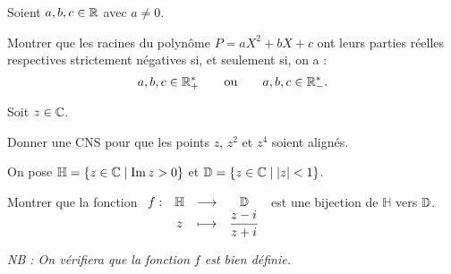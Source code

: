 \begin{corr}
\end{corr}

\begin{exo}[Exercice 18]
Soient \(a,b,c\in\mathbb{R}\) avec \(a\not=0\).

Montrer que les racines du polynôme \(P=aX^2+bX+c\) ont leurs parties réelles respectives strictement négatives si, et seulement si, on a : \[a,b,c\in\mathbb{R}_+^*\qquad\text{ou}\qquad a,b,c\in\mathbb{R}_-^*.\]
\end{exo}

\begin{corr}
\end{corr}

\begin{exo}[Exercice 19]
Soit \(z\in\mathbb{C}\).

Donner une CNS pour que les points \(z\), \(z^2\) et \(z^4\) soient alignés.
\end{exo}

\begin{corr}
\end{corr}

\begin{exo}[Exercice 20]
On pose \(\mathbb{H}=\left\lbrace z\in\mathbb{C}\;\middle|\;\operatorname{Im} z>0\right\rbrace\) et \(\mathbb{D}=\left\lbrace z\in\mathbb{C}\;\middle|\;\left\lvert z\right\rvert<1\right\rbrace\).

Montrer que la fonction \(\begin{array}[t]{cccc}f : & \mathbb{H} & \longrightarrow & \mathbb{D} \\ & z & \longmapsto & \dfrac{z-i\mkern1mu}{z+i\mkern1mu}\end{array}\) est une bijection de \(\mathbb{H}\) vers \(\mathbb{D}\).

\textit{NB : On vérifiera que la fonction \(f\) est bien définie.}
\end{exo}

\begin{corr}
\end{corr}